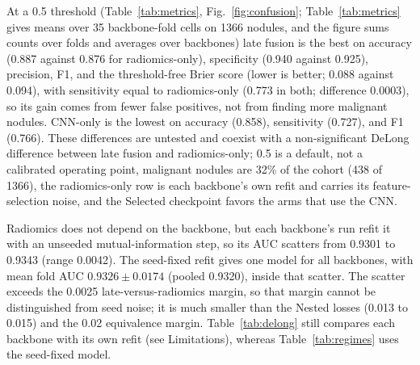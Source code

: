 \documentclass[conference]{IEEEtran}
\begin{document}
At a 0.5 threshold (Table~\ref{tab:metrics}, Fig.~\ref{fig:confusion}; Table~\ref{tab:metrics} gives means over 35 backbone-fold cells on 1366 nodules, and the figure sums counts over folds and averages over backbones) late fusion is the best on accuracy (0.887 against 0.876 for radiomics-only), specificity (0.940 against 0.925), precision, F1, and the threshold-free Brier score (lower is better; 0.088 against 0.094), with sensitivity equal to radiomics-only (0.773 in both; difference 0.0003), so its gain comes from fewer false positives, not from finding more malignant nodules. CNN-only is the lowest on accuracy (0.858), sensitivity (0.727), and F1 (0.766). These differences are untested and coexist with a non-significant DeLong difference between late fusion and radiomics-only; 0.5 is a default, not a calibrated operating point, malignant nodules are 32\% of the cohort (438 of 1366), the radiomics-only row is each backbone's own refit and carries its feature-selection noise, and the Selected checkpoint favors the arms that use the CNN.

Radiomics does not depend on the backbone, but each backbone's run refit it with an unseeded mutual-information step, so its AUC scatters from 0.9301 to 0.9343 (range 0.0042). The seed-fixed refit gives one model for all backbones, with mean fold AUC $0.9326\pm0.0174$ (pooled 0.9320), inside that scatter. The scatter exceeds the 0.0025 late-versus-radiomics margin, so that margin cannot be distinguished from seed noise; it is much smaller than the Nested losses (0.013 to 0.015) and the 0.02 equivalence margin. Table~\ref{tab:delong} still compares each backbone with its own refit (see Limitations), whereas Table~\ref{tab:regimes} uses the seed-fixed model.
\end{document}
